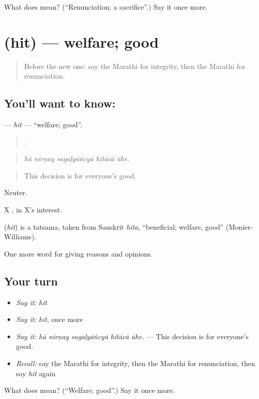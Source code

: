 \begin{tcolorbox}[breakable,colback=teal!4,colframe=teal!35!black,title={Before you move on}]
What does  mean? (\textquotedblleft{}Renunciation; a sacrifice\textquotedblright{}.) Say it once more.
\end{tcolorbox}
\section[\texorpdfstring{\mr{हित} (hit)}{हित (hit)}]{ (hit) — welfare; good}

\label{lesson:MR-C366-hit}



\begin{quote}
Before the new one: say the Marathi for integrity, then the Marathi for renunciation.
\end{quote}

\subsection*{You'll want to know: }
\textbf{} — \emph{hit} — \textquotedblleft{}welfare; good\textquotedblright{}.

\begin{quote}
    .
\end{quote}

\begin{quote}
\emph{hā nirṇay sagaḷyāñcyā hitācā āhe.}
\end{quote}

\begin{quote}
This decision is for everyone's good.
\end{quote}

Neuter.

X  , in X's interest.

\begin{cousinweb}
\textbf{} (\emph{hit}) is a tatsama, taken from Sanskrit \emph{hita}, \textquotedblleft{}beneficial; welfare, good\textquotedblright{} (Monier-Williams).
\end{cousinweb}

\begin{grammarlens}[title={What you've built}]
One more word for giving reasons and opinions.
\end{grammarlens}

\subsection*{Your turn}
\begin{itemize}
\raggedright
  \item \emph{Say it:} \emph{hit}
  \item \emph{Say it:} \emph{hit}, once more
  \item \emph{Say it:} \emph{hā nirṇay sagaḷyāñcyā hitācā āhe.} — This decision is for everyone's good.
  \item \emph{Recall:} say the Marathi for integrity, then the Marathi for renunciation, then say \emph{hit} again
\end{itemize}

\begin{tcolorbox}[breakable,colback=teal!4,colframe=teal!35!black,title={Before you move on}]
What does  mean? (\textquotedblleft{}Welfare; good\textquotedblright{}.) Say it once more.
\end{tcolorbox}
